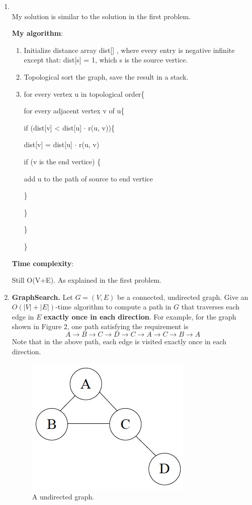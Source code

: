 \documentclass[12pt,a4paper]{article}
\makeatletter
\newtheorem*{solution}{Solution}
\theoremstyle{definition}
\renewenvironment{solution}[1][Solution] {\par\pushQED{\qed}\normalfont\topsep6\p@\@plus6\p@\relax\trivlist\item[\hskip\labelsep\bfseries#1\@addpunct{.}]\ignorespaces}{\popQED\endtrivlist\@endpefalse} \makeatother
\makeatother
\begin{document}
\begin{enumerate}
\begin{solution}
	~\\
	My solution is similar to the solution in the first problem.
	
\textbf{My algorithm}:
   \begin{enumerate}
	\item Initialize distance array dist[] , where every entry is negative infinite except that: dist[s] = 1, which s is the source vertice.
	\item Topological sort the graph,  save the result in a stack.
	\item
	for every vertex u in topological order\{
	
	\qquad for every adjacent  vertex v of u\{
	
	\qquad \qquad if (dist[v] < dist[u] $\cdot$ r(u, v))\{
	
	\qquad \qquad \qquad dist[v] = dist[u] $\cdot $ r(u, v)
	
	\qquad \qquad \qquad if (v is the end vertice) \{
	
	\qquad \qquad \qquad \qquad add u to the path of source to end vertice
	
	\qquad \qquad \qquad \}
	
	\qquad \qquad \}
	
	\qquad \}
	
	\}
	
	

\end{enumerate}

\textbf{Time complexity}:

Still O(V+E). As explained in the first problem.

\end{solution}

\item \textbf{GraphSearch.} Let $G=(V,E)$ be a connected, undirected graph. Give an $O(|V|+|E|)$-time algorithm to compute a path in $G$ that traverses each edge in $E$ \textbf{exactly once in each direction}. For example, for the graph shown in Figure 2, one path satisfying the requirement is
$$A \rightarrow B \rightarrow C \rightarrow D \rightarrow C \rightarrow A \rightarrow C \rightarrow B \rightarrow A$$
Note that in the above path, each edge is visited exactly once in each direction.

\begin{figure}[h]
 \centering
 \includegraphics[scale=0.35]{Lab08-figure2.jpg}
 \caption{A undirected graph.}
\end{figure}


\end{enumerate}
\end{document}
